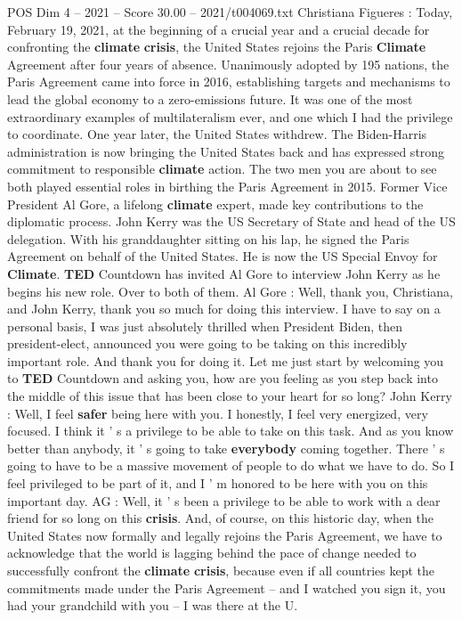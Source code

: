 \begin{textsample}{POS Dim 4 – 2021 – Score 30.00 – 2021/t004069.txt}  \label{ex:f4_pos_033}
Christiana Figueres : Today, February 19, 2021, at the beginning of a crucial year and a crucial decade for confronting the \textbf{climate} \textbf{crisis}, the United States rejoins the Paris \textbf{Climate} Agreement after four years of absence.
Unanimously adopted by 195 nations, the Paris Agreement came into force in 2016, establishing targets and mechanisms to lead the global economy to a zero-emissions future.
It was one of the most extraordinary examples of multilateralism ever, and one which I had the privilege to coordinate.
One year later, the United States withdrew.
The Biden-Harris administration is now bringing the United States back and has expressed strong commitment to responsible \textbf{climate} action.
The two men you are about to see both played essential roles in birthing the Paris Agreement in 2015.
Former Vice President Al Gore, a lifelong \textbf{climate} expert, made key contributions to the diplomatic process.
John Kerry was the US Secretary of State and head of the US delegation.
With his granddaughter sitting on his lap, he signed the Paris Agreement on behalf of the United States.
He is now the US Special Envoy for \textbf{Climate}. \textbf{TED} Countdown has invited Al Gore to interview John Kerry as he begins his new role.
Over to both of them.
Al Gore : Well, thank you, Christiana, and John Kerry, thank you so much for doing this interview.
I have to say on a personal basis, I was just absolutely thrilled when President Biden, then president-elect, announced you were going to be taking on this incredibly important role.
And thank you for doing it.
Let me just start by welcoming you to \textbf{TED} Countdown and asking you, how are you feeling as you step back into the middle of this issue that has been close to your heart for so long?
John Kerry : Well, I feel \textbf{safer} being here with you.
I honestly, I feel very energized, very focused.
I think it ' s a privilege to be able to take on this task.
And as you know better than anybody, it ' s going to take \textbf{everybody} coming together.
There ' s going to have to be a massive movement of people to do what we have to do.
So I feel privileged to be part of it, and I ' m honored to be here with you on this important day.
AG : Well, it ' s been a privilege to be able to work with a dear friend for so long on this \textbf{crisis}.
And, of course, on this historic day, when the United States now formally and legally rejoins the Paris Agreement, we have to acknowledge that the world is lagging behind the pace of change needed to successfully confront the \textbf{climate} \textbf{crisis}, because even if all countries kept the commitments made under the Paris Agreement -- and I watched you sign it, you had your grandchild with you -- I was there at the U.

\end{textsample}
